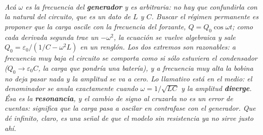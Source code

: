 \begin{center}
\\[0.5em]
{\small\itshape Acá $\omega$ es la frecuencia del \textbf{generador} y es
arbitraria: no hay que confundirla con la natural del circuito, que es un dato
de $L$ y $C$. Buscar el régimen permanente es proponer que la carga oscile con
la frecuencia del forzante, $Q = Q_0\cos\omega t$; como cada derivada segunda
trae un $-\omega^2$, la ecuación se vuelve algebraica y sale
$Q_0 = \varepsilon_0/(1/C - \omega^2 L)$ en un renglón. Los dos extremos son
razonables: a frecuencia muy baja el circuito se comporta como si sólo estuviera
el condensador ($Q_0 \to \varepsilon_0 C$, la carga que pondría una batería), y a
frecuencia muy alta la bobina no deja pasar nada y la amplitud se va a cero. Lo
llamativo está en el medio: el denominador se anula exactamente cuando
$\omega = 1/\sqrt{LC}$ y la amplitud \textbf{diverge}. Ésa es la
\textbf{resonancia}, y el cambio de signo al cruzarla no es un error de cuentas:
significa que la carga pasa a oscilar en contrafase con el generador. Que dé
infinito, claro, es una señal de que el modelo sin resistencia ya no sirve
justo ahí.}
\end{center}
